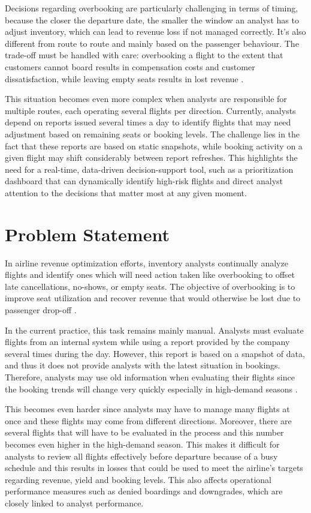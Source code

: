 Decisions regarding overbooking are particularly challenging in terms of timing, because the closer the departure date, the smaller the window an analyst has to adjust inventory, which can lead to revenue loss if not managed correctly. It's also different from route to route and mainly based on the passenger behaviour. The trade-off must be handled with care: overbooking a flight to the extent that customers cannot board results in compensation costs and customer dissatisfaction, while leaving empty seats results in lost revenue \citep{SomboonAmaruchkul2016}.

This situation becomes even more complex when analysts are responsible for multiple routes, each operating several flights per direction. Currently, analysts depend on reports issued several times a day to identify flights that may need adjustment based on remaining seats or booking levels. The challenge lies in the fact that these reports are based on static snapshots, while booking activity on a given flight may shift considerably between report refreshes. This highlights the need for a real-time, data-driven decision-support tool, such as a prioritization dashboard that can dynamically identify high-risk flights and direct analyst attention to the decisions that matter most at any given moment.

\section{Problem Statement}
\label{sec:problem}

In airline revenue optimization efforts, inventory analysts continually analyze flights and identify ones which will need action taken like overbooking to offset late cancellations, no-shows, or empty seats. The objective of overbooking is to improve seat utilization and recover revenue that would otherwise be lost due to passenger drop-off \citep{SomboonAmaruchkul2016}.

In the current practice, this task remains mainly manual. Analysts must evaluate flights from an internal system while using a report provided by the company several times during the day. However, this report is based on a snapshot of data, and thus it does not provide analysts with the latest situation in bookings. Therefore, analysts may use old information when evaluating their flights since the booking trends will change very quickly especially in high-demand seasons \citep{Cooper2016, YigitbasiogluVelcu2012}.

This becomes even harder since analysts may have to manage many flights at once and these flights may come from different directions. Moreover, there are several flights that will have to be evaluated in the process and this number becomes even higher in the high-demand season. This makes it difficult for analysts to review all flights effectively before departure because of a busy schedule and this results in losses that could be used to meet the airline's targets regarding revenue, yield and booking levels. This also affects operational performance measures such as denied boardings and downgrades, which are closely linked to analyst performance.

